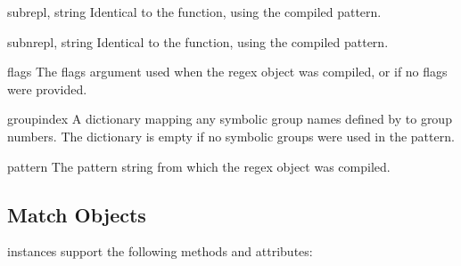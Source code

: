 \begin{methoddesc}[RegexObject]{sub}{repl, string}
Identical to the  function, using the compiled pattern.
\end{methoddesc}

\begin{methoddesc}[RegexObject]{subn}{repl, string}
Identical to the  function, using the compiled pattern.
\end{methoddesc}


\begin{memberdesc}[RegexObject]{flags}
The flags argument used when the regex object was compiled, or
 if no flags were provided.
\end{memberdesc}

\begin{memberdesc}[RegexObject]{groupindex}
A dictionary mapping any symbolic group names defined by 
 to group numbers.  The dictionary is empty if no
symbolic groups were used in the pattern.
\end{memberdesc}

\begin{memberdesc}[RegexObject]{pattern}
The pattern string from which the regex object was compiled.
\end{memberdesc}


\subsection{Match Objects}
\label{match-objects}

 instances support the following methods and attributes:

